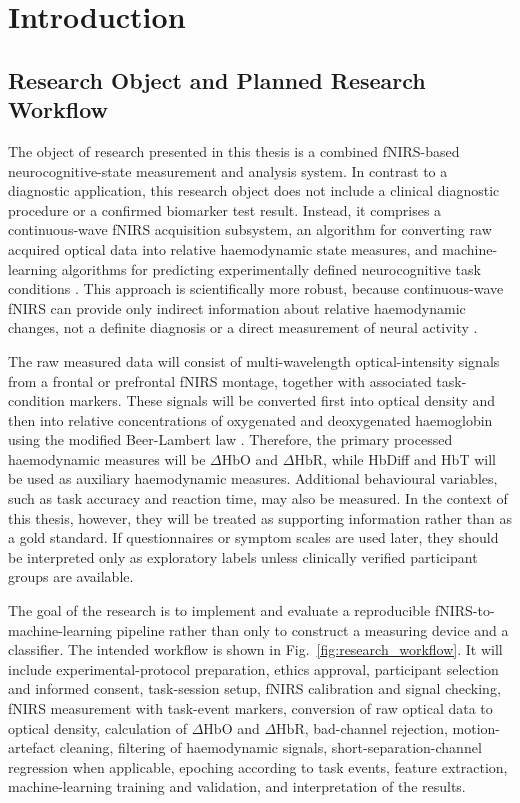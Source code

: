 \section{Introduction}

\subsection{Research Object and Planned Research Workflow}

The object of research presented in this thesis is a combined fNIRS-based neurocognitive-state measurement and analysis system. In contrast to a diagnostic application, this research object does not include a clinical diagnostic procedure or a confirmed biomarker test result. Instead, it comprises a continuous-wave fNIRS acquisition subsystem, an algorithm for converting raw acquired optical data into relative haemodynamic state measures, and machine-learning algorithms for predicting experimentally defined neurocognitive task conditions \cite{Eastmond2022,Benerradi2023,Khan2025}. This approach is scientifically more robust, because continuous-wave fNIRS can provide only indirect information about relative haemodynamic changes, not a definite diagnosis or a direct measurement of neural activity \cite{Yucel2021,Scholkmann2022,Amendola2023}.

The raw measured data will consist of multi-wavelength optical-intensity signals from a frontal or prefrontal fNIRS montage, together with associated task-condition markers. These signals will be converted first into optical density and then into relative concentrations of oxygenated and deoxygenated haemoglobin using the modified Beer-Lambert law \cite{Yucel2021,Amendola2023,Stute2025}. Therefore, the primary processed haemodynamic measures will be \(\Delta\mathrm{HbO}\) and \(\Delta\mathrm{HbR}\), while HbDiff and HbT will be used as auxiliary haemodynamic measures. Additional behavioural variables, such as task accuracy and reaction time, may also be measured. In the context of this thesis, however, they will be treated as supporting information rather than as a gold standard. If questionnaires or symptom scales are used later, they should be interpreted only as exploratory labels unless clinically verified participant groups are available.

The goal of the research is to implement and evaluate a reproducible fNIRS-to-machine-learning pipeline rather than only to construct a measuring device and a classifier. The intended workflow is shown in Fig.~\ref{fig:research_workflow}. It will include experimental-protocol preparation, ethics approval, participant selection and informed consent, task-session setup, fNIRS calibration and signal checking, fNIRS measurement with task-event markers, conversion of raw optical data to optical density, calculation of \(\Delta\mathrm{HbO}\) and \(\Delta\mathrm{HbR}\), bad-channel rejection, motion-artefact cleaning, filtering of haemodynamic signals, short-separation-channel regression when applicable, epoching according to task events, feature extraction, machine-learning training and validation, and interpretation of the results.

